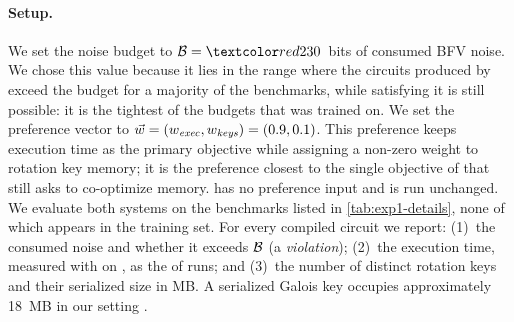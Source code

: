 \paragraph{Setup.}
We set the noise budget to $\budget = \ex{230}$~bits of consumed BFV noise.
We chose this value because it lies in the range where the circuits produced
by \baseline{} exceed the budget for a majority of the benchmarks, while
satisfying it is still possible: it is the tightest of the budgets that
\cmorl{} was trained on.
We set the preference vector to $\vec{w} = (w_{\mathit{exec}}, w_{\mathit{keys}}) = (0.9, 0.1)$.
This preference keeps execution time as the primary objective while assigning
a non-zero weight to rotation key memory; it is the preference closest to the
single objective of \chehabrl{} that still asks \cmorl{} to co-optimize
memory. \baseline{} has no preference input and is run unchanged.
We evaluate both systems on the  benchmarks listed in
\cref{tab:exp1-details}, none of which appears in the training set.
For every compiled circuit we report:
(1)~the consumed noise and whether it exceeds $\mathcal{B}$ (a \emph{violation});
(2)~the execution time, measured with  on
, as the  of  runs;
and (3)~the number of distinct rotation keys and their serialized size in MB.
A serialized Galois key occupies approximately 18~MB in our setting
.


